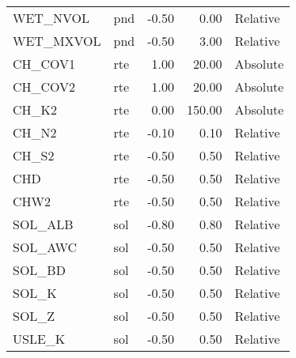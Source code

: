 \begin{table}[ht]
\begin{tabular}{llrrl}
  WET\_NVOL & pnd & -0.50 & 0.00 & Relative \\ 
  WET\_MXVOL & pnd & -0.50 & 3.00 & Relative \\ 
  CH\_COV1 & rte & 1.00 & 20.00 & Absolute \\ 
  CH\_COV2 & rte & 1.00 & 20.00 & Absolute \\ 
  CH\_K2 & rte & 0.00 & 150.00 & Absolute \\ 
  CH\_N2 & rte & -0.10 & 0.10 & Relative \\ 
  CH\_S2 & rte & -0.50 & 0.50 & Relative \\ 
  CHD & rte & -0.50 & 0.50 & Relative \\ 
  CHW2 & rte & -0.50 & 0.50 & Relative \\ 
  SOL\_ALB & sol & -0.80 & 0.80 & Relative \\ 
  SOL\_AWC & sol & -0.50 & 0.50 & Relative \\ 
  SOL\_BD & sol & -0.50 & 0.50 & Relative \\ 
  SOL\_K & sol & -0.50 & 0.50 & Relative \\ 
  SOL\_Z & sol & -0.50 & 0.50 & Relative \\ 
  USLE\_K & sol & -0.50 & 0.50 & Relative \\ 
   \hline
\end{tabular}
\end{table}
